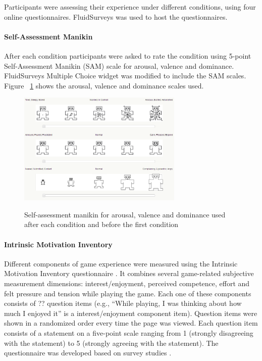 Participants were assessing their experience under different conditions, using four online questionnaires. FluidSurveys was used to host the questionnaires.

\paragraph{Self-Assessment Manikin}

After each condition participants were asked to rate the condition using 5-point Self-Assessment Manikin (SAM) \cite{bradley1994measuring} scale for arousal, valence and dominance. \textregistered FluidSurveys Multiple Choice widget was modified to include the SAM scales. Figure ~\ref{fig:sam} shows the arousal, valence and dominance scales used.

\begin{figure}[h!]
  \caption[Self-assessment manikin]
  {Self-assessment manikin for arousal, valence and dominance used after each condition and before the first condition}
  \centering
  \includegraphics[width=0.7\textwidth]{images/sam.png}
  \label{fig:sam}
\end{figure}

\paragraph{Intrinsic Motivation Inventory}

Different components of game experience were measured using the Intrinsic Motivation Inventory questionnaire \cite{?}. It combines several game-related subjective measurement dimensions: interest/enjoyment, perceived competence, effort and felt pressure and tension while playing the game. Each one of these components consists of ?? question items (e.g., ``While playing, I was thinking about how much I enjoyed it'' is a interest/enjoyment component item). Question items were shown in a randomized order every time the page was viewed. Each question item consists of a statement on a five-point scale ranging from 1 (strongly disagreeing with the statement) to 5 (strongly agreeing with the statement). The questionnaire was developed based on survey studies \cite{?}.

